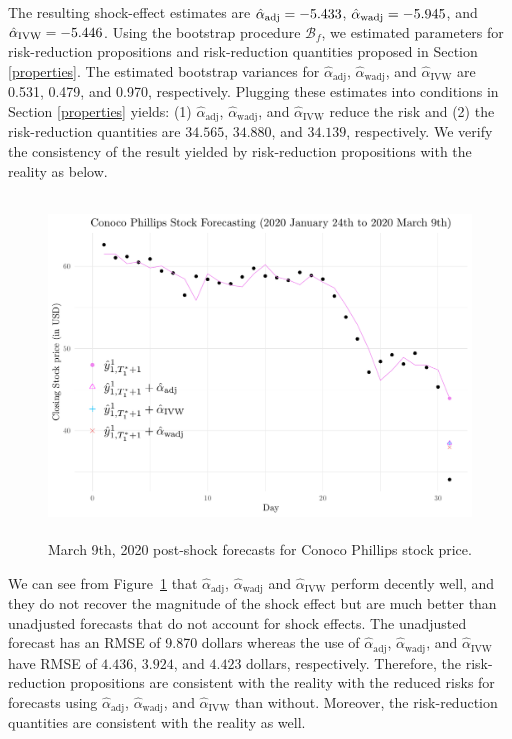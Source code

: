 \documentclass[11pt]{article}
\def\mc#1{\mathcal{#1}} %
\theoremstyle{definition}
\begin{document}
The resulting shock-effect estimates are $\hat{\alpha}_{\rm adj}=-5.433$, $\hat{\alpha}_{\rm wadj}= -5.945$, and $\hat{\alpha}_{\rm IVW}=-5.446$. Using the bootstrap procedure $\mc{B}_f$, we estimated parameters for risk-reduction propositions and risk-reduction quantities proposed in  Section \ref{properties}. The estimated bootstrap variances for $\hat{\alpha}_{\text{adj}}$, $\hat{\alpha}_{\text{wadj}}$, and $\hat{\alpha}_{\text{IVW}}$  are 0.531, 0.479, and 0.970, respectively. Plugging these estimates into conditions in Section \ref{properties} yields: (1) $\hat{\alpha}_{\text{adj}}$, $\hat{\alpha}_{\text{wadj}}$, and $\hat{\alpha}_{\text{IVW}}$  reduce the risk and (2) the risk-reduction quantities are $34.565$, $34.880$, and $34.139$, respectively. We verify the consistency of the result yielded by risk-reduction propositions with the reality as below.

\begin{figure}
  \begin{center}
    \includegraphics[height = 9cm]{fig2.pdf}
    \caption{March 9th, 2020 post-shock forecasts for Conoco Phillips stock price.}
    \label{Fig:CP}
  \end{center}  
  \vspace{-.6cm}
\end{figure}


We can see from Figure~\ref{Fig:CP} that $\hat{\alpha}_{\text{adj}}$, $\hat{\alpha}_{\text{wadj}}$ and $\hat{\alpha}_{\text{IVW}}$ perform decently well, and they do not recover the magnitude of the shock effect but are much better than unadjusted forecasts that do not account for shock effects. 
The unadjusted forecast has an RMSE of 9.870 dollars whereas 
the use of $\hat{\alpha}_{\text{adj}}$, $\hat{\alpha}_{\text{wadj}}$, and $\hat{\alpha}_{\text{IVW}}$ have  RMSE of $4.436$, $3.924$, and $4.423$ dollars, respectively. 
Therefore, the risk-reduction propositions are consistent with the reality  with the reduced risks for forecasts using  $\hat{\alpha}_{\text{adj}}$, $\hat{\alpha}_{\text{wadj}}$, and $\hat{\alpha}_{\text{IVW}}$ than without. Moreover, the risk-reduction quantities are consistent with the reality as well. 
\end{document}
